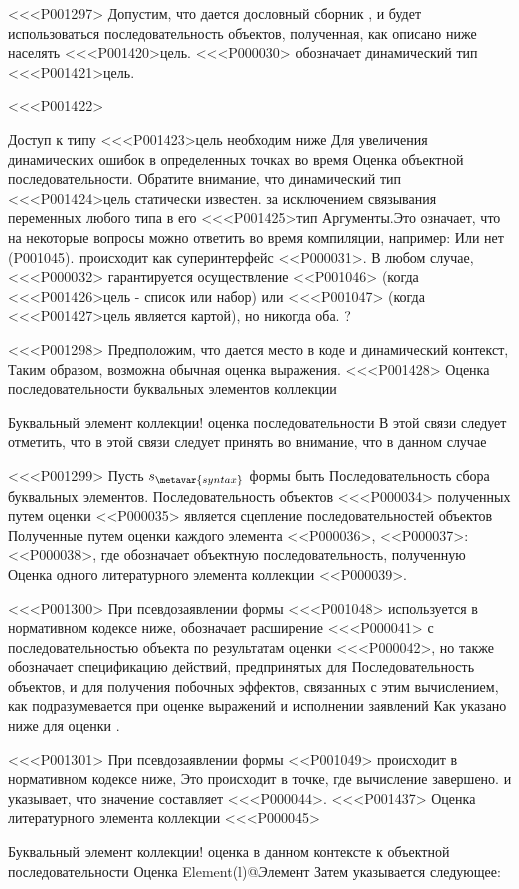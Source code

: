 {{<<<P001297>%
Допустим, что дается дословный сборник ,
и будет использоваться последовательность объектов, полученная, как описано ниже
населять <<<P001420>{цель}.
<<<P000030> обозначает динамический тип <<<P001421>{цель}.

<<<P001422>{%
Доступ к типу <<<P001423>{цель} необходим ниже
Для увеличения динамических ошибок в определенных точках во время
Оценка объектной последовательности.
Обратите внимание, что динамический тип <<<P001424>{цель} статически известен.
за исключением связывания переменных любого типа в его <<<P001425>{тип Аргументы}.Это означает, что на некоторые вопросы можно ответить во время компиляции, например:
Или нет (P001045). происходит как суперинтерфейс
<<P000031>.
В любом случае, <<<P000032> гарантируется осуществление
<<P001046> (когда <<<P001426>{цель} - список или набор)
или <<<P001047> (когда <<<P001427>{цель} является картой),
но никогда оба.%
?

<<<P001298>%
Предположим, что дается место в коде и динамический контекст,
Таким образом, возможна обычная оценка выражения.
<<<P001428> Оценка последовательности буквальных элементов коллекции {%
Буквальный элемент коллекции! оценка последовательности
В этой связи следует отметить, что в этой связи следует принять во внимание, что в данном случае

<<<P001299>%
Пусть $s_{\metavar{syntax}}$ формы  быть
Последовательность сбора буквальных элементов.
Последовательность объектов <<<P000034>
полученных путем оценки <<P000035>
является сцепление последовательностей объектов
Полученные путем оценки каждого элемента <<P000036>, <<P000037>:
<<P000038>,
где  обозначает объектную последовательность, полученную
Оценка одного литературного элемента коллекции <<P000039>.

<<<P001300>%
При псевдозаявлении формы
<<<P001048>
используется в нормативном кодексе ниже,
обозначает расширение <<<P000041> с последовательностью объекта
по результатам оценки <<<P000042>,
но также обозначает спецификацию действий, предпринятых для
Последовательность объектов,
и для получения побочных эффектов, связанных с этим вычислением,
как подразумевается при оценке выражений и исполнении заявлений
Как указано ниже для оценки \EvaluateElement{\ell}.

<<<P001301>%
При псевдозаявлении формы
<<P001049>
происходит в нормативном кодексе ниже,
Это происходит в точке, где вычисление завершено.
и указывает, что значение \EvaluateElement{\ell} составляет <<<P000044>.
<<<P001437> Оценка литературного элемента коллекции <<<P000045>{%
Буквальный элемент коллекции! оценка
в данном контексте
к объектной последовательности
\IndexCustom{\EvaluateElement{\ell>>>}}
Оценка Element(l)@\emph Элемент
Затем указывается следующее:

}}}}}
